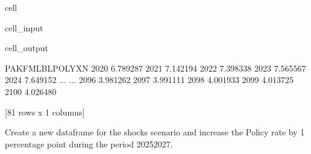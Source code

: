 \documentclass[letterpaper,10pt,english]{jupyterBook}
\begin{document}
\begin{sphinxuseclass}{cell}\begin{sphinxVerbatimInput}

\begin{sphinxuseclass}{cell_input}
\begin{sphinxVerbatim}[commandchars=\\\{\}]
\PYG{p}{[}\PYG{p}{]}
\end{sphinxVerbatim}

\end{sphinxuseclass}\end{sphinxVerbatimInput}
\begin{sphinxVerbatimOutput}

\begin{sphinxuseclass}{cell_output}
\begin{sphinxVerbatim}[commandchars=\\\{\}]
      PAKFMLBLPOLYXN
2020        6.789287
2021        7.142194
2022        7.398338
2023        7.565567
2024        7.649152
...              ...
2096        3.981262
2097        3.991111
2098        4.001933
2099        4.013725
2100        4.026480

[81 rows x 1 columns]
\end{sphinxVerbatim}

\end{sphinxuseclass}\end{sphinxVerbatimOutput}

\end{sphinxuseclass}
\sphinxAtStartPar
Create a new dataframe for the shocks scenario and increase the Policy rate by 1 percentage point during the period 2025\sphinxhyphen{}2027.
\end{document}

